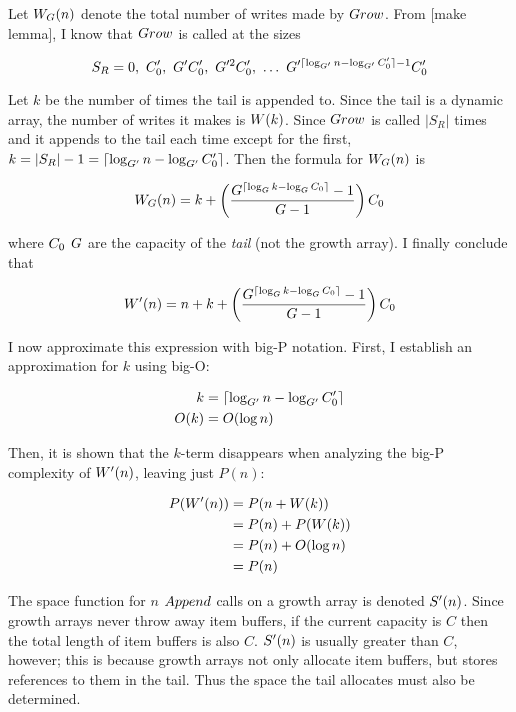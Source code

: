 Let $W_G(n)$ denote the total number of writes made by $Grow$. From [make lemma], I know that $Grow$ is called at the sizes

$$
S_R = 0,\ \InitCapacitynew,\ \GrowthFactornew\InitCapacitynew,\ \GrowthFactornew^2\InitCapacitynew,\ \ldots\ \GrowthFactornew^{\lceil \log_{\GrowthFactornew} n - \log_{\GrowthFactornew} \InitCapacitynew \rceil - 1}\InitCapacitynew
$$

Let $k$ be the number of times the tail is appended to. Since the tail is a dynamic array, the number of writes it makes is $W(k)$. Since $Grow$ is called $|S_R|$ times and it appends to the tail each time except for the first, $k = |S_R| - 1 = \lceil \log_{G'} n - \log_{G'} C_0' \rceil$. Then the formula for $W_G(n)$ is

$$
W_G(n) = k + \left( \frac{G^{\lceil \log_{G} k - \log_{G} C_0 \rceil} - 1}{G - 1} \right) C_0
$$

where $C_0$ $G$ are the capacity of the \textit{tail} (not the growth array). I finally conclude that

$$
W'(n) = n + k + \left( \frac{G^{\lceil \log_{G} k - \log_{G} C_0 \rceil} - 1}{G - 1} \right) C_0
$$

I now approximate this expression with big-P notation. First, I establish an approximation for $k$ using big-O:

\begin{align*}
k &= \lceil \log_{G'} n - \log_{G'} C_0' \rceil\\
O(k) &= O(\log n)
\end{align*}

Then, it is shown that the $k$-term disappears when analyzing the big-P complexity of $W'(n)$, leaving just $P(n)$:

\begin{align*}
P(W'(n)) &= P(n + W(k))\\
&= P(n) + P(W(k))\\
&= P(n) + O(\log n)\\
&= P(n)
\end{align*}

\HdrSpaceComplex

The space function for $n$ $Append$ calls on a growth array is denoted $S'(n)$. Since growth arrays never throw away item buffers, if the current capacity is $C$ then the total length of item buffers is also $C$. $S'(n)$ is usually greater than $C$, however; this is because growth arrays not only allocate item buffers, but stores references to them in the tail. Thus the space the tail allocates must also be determined.


